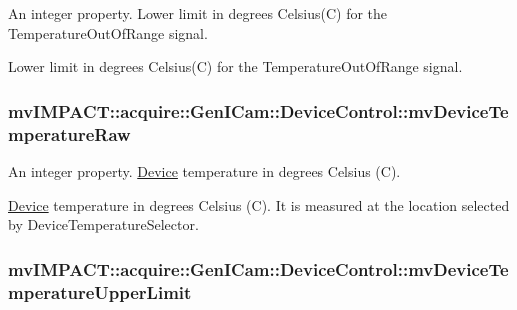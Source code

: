 An integer property. Lower limit in degrees Celsius(\+C) for the Temperature\+Out\+Of\+Range signal. 

Lower limit in degrees Celsius(\+C) for the Temperature\+Out\+Of\+Range signal. \hypertarget{classmv_i_m_p_a_c_t_1_1acquire_1_1_gen_i_cam_1_1_device_control_a02e49d3e69035f6221d919a791e9f739}{
\subsubsection[{mv\+Device\+Temperature\+Raw}]{ mv\+I\+M\+P\+A\+C\+T\+::acquire\+::\+Gen\+I\+Cam\+::\+Device\+Control\+::mv\+Device\+Temperature\+Raw}}\label{classmv_i_m_p_a_c_t_1_1acquire_1_1_gen_i_cam_1_1_device_control_a02e49d3e69035f6221d919a791e9f739}


An integer property. \hyperlink{classmv_i_m_p_a_c_t_1_1acquire_1_1_device}{Device} temperature in degrees Celsius (C). 

\hyperlink{classmv_i_m_p_a_c_t_1_1acquire_1_1_device}{Device} temperature in degrees Celsius (C). It is measured at the location selected by Device\+Temperature\+Selector. \hypertarget{classmv_i_m_p_a_c_t_1_1acquire_1_1_gen_i_cam_1_1_device_control_a56b212b9f38073690363d3a3ffbce955}{
\subsubsection[{mv\+Device\+Temperature\+Upper\+Limit}]{ mv\+I\+M\+P\+A\+C\+T\+::acquire\+::\+Gen\+I\+Cam\+::\+Device\+Control\+::mv\+Device\+Temperature\+Upper\+Limit}}\label{classmv_i_m_p_a_c_t_1_1acquire_1_1_gen_i_cam_1_1_device_control_a56b212b9f38073690363d3a3ffbce955}


